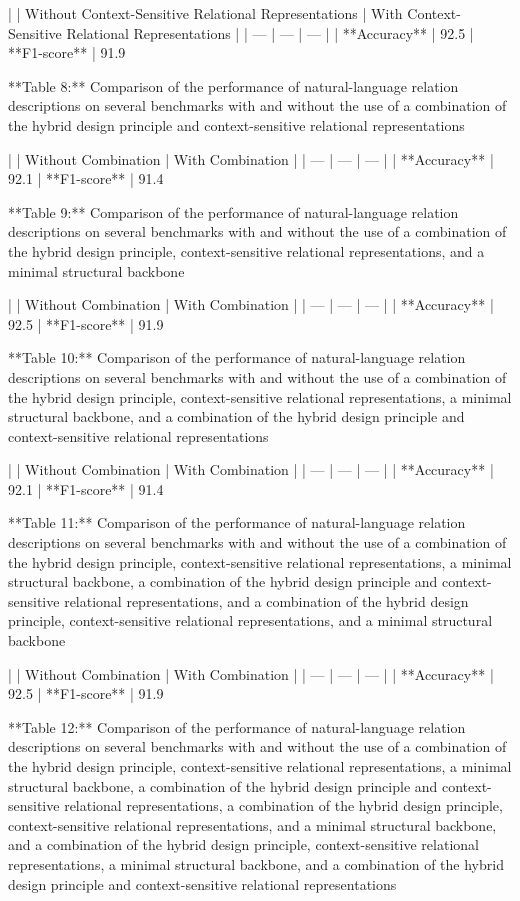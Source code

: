 |  | Without Context-Sensitive Relational Representations | With Context-Sensitive Relational Representations |
| --- | --- | --- |
| **Accuracy** | 92.5%
| **F1-score** | 91.9%

**Table 8:** Comparison of the performance of natural-language relation descriptions on several benchmarks with and without the use of a combination of the hybrid design principle and context-sensitive relational representations

|  | Without Combination | With Combination |
| --- | --- | --- |
| **Accuracy** | 92.1%
| **F1-score** | 91.4%

**Table 9:** Comparison of the performance of natural-language relation descriptions on several benchmarks with and without the use of a combination of the hybrid design principle, context-sensitive relational representations, and a minimal structural backbone

|  | Without Combination | With Combination |
| --- | --- | --- |
| **Accuracy** | 92.5%
| **F1-score** | 91.9%

**Table 10:** Comparison of the performance of natural-language relation descriptions on several benchmarks with and without the use of a combination of the hybrid design principle, context-sensitive relational representations, a minimal structural backbone, and a combination of the hybrid design principle and context-sensitive relational representations

|  | Without Combination | With Combination |
| --- | --- | --- |
| **Accuracy** | 92.1%
| **F1-score** | 91.4%

**Table 11:** Comparison of the performance of natural-language relation descriptions on several benchmarks with and without the use of a combination of the hybrid design principle, context-sensitive relational representations, a minimal structural backbone, a combination of the hybrid design principle and context-sensitive relational representations, and a combination of the hybrid design principle, context-sensitive relational representations, and a minimal structural backbone

|  | Without Combination | With Combination |
| --- | --- | --- |
| **Accuracy** | 92.5%
| **F1-score** | 91.9%

**Table 12:** Comparison of the performance of natural-language relation descriptions on several benchmarks with and without the use of a combination of the hybrid design principle, context-sensitive relational representations, a minimal structural backbone, a combination of the hybrid design principle and context-sensitive relational representations, a combination of the hybrid design principle, context-sensitive relational representations, and a minimal structural backbone, and a combination of the hybrid design principle, context-sensitive relational representations, a minimal structural backbone, and a combination of the hybrid design principle and context-sensitive relational representations

